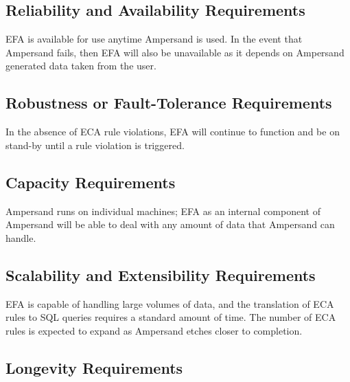 \documentclass[12pt]{report}
\begin{document}
\subsection{Reliability and Availability Requirements}\label{subsec:AvailReq}
EFA is available for use anytime Ampersand is used. In the event that Ampersand 
fails, then EFA will also be unavailable as it depends on Ampersand generated 
data taken from the user.

\subsection{Robustness or Fault-Tolerance Requirements}\label{subsec:FaultReq}

In the absence of ECA rule violations, EFA will continue to function and be on 
stand-by until a rule violation is triggered.
\subsection{Capacity Requirements}\label{subsec:CapacityReq}
Ampersand runs on individual machines; EFA as an internal component of 
Ampersand will be able to deal with any amount of data that Ampersand can 
handle. 
\subsection{Scalability and Extensibility 
Requirements}\label{subsec:ScalabilityReq}
EFA is capable of handling large volumes of data, and the translation of ECA 
rules to SQL queries requires a standard amount of time. The number of ECA 
rules is expected to expand as Ampersand etches closer to completion. 

\subsection{Longevity Requirements}\label{subsec:LongevityReq}


\end{document}
